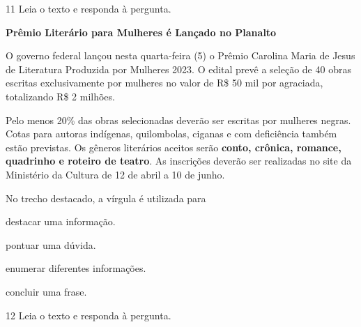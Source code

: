 \pagebreak
\num{11} Leia o texto e responda à pergunta.

\begin{myquote}
\textbf{Prêmio Literário para Mulheres é Lançado no Planalto}

O governo federal lançou nesta quarta-feira (5) o Prêmio Carolina Maria
de Jesus de Literatura Produzida por Mulheres 2023. O edital prevê a
seleção de 40 obras escritas exclusivamente por mulheres no valor de R\$
50 mil por agraciada, totalizando R\$ 2 milhões.

Pelo menos 20\% das obras selecionadas deverão ser escritas por mulheres
negras. Cotas para autoras indígenas, quilombolas, ciganas e com
deficiência também estão previstas. Os gêneros literários aceitos serão
\textbf{conto, crônica, romance, quadrinho e roteiro de teatro}. As
inscrições deverão ser realizadas no site da Ministério da Cultura de 12
de abril a 10 de junho.

\end{myquote}

No trecho destacado, a vírgula é utilizada para

\begin{escolha}
  \item destacar uma informação.

  \item pontuar uma dúvida.

  \item enumerar diferentes informações.

  \item concluir uma frase.
\end{escolha}

\num{12} Leia o texto e responda à pergunta.

